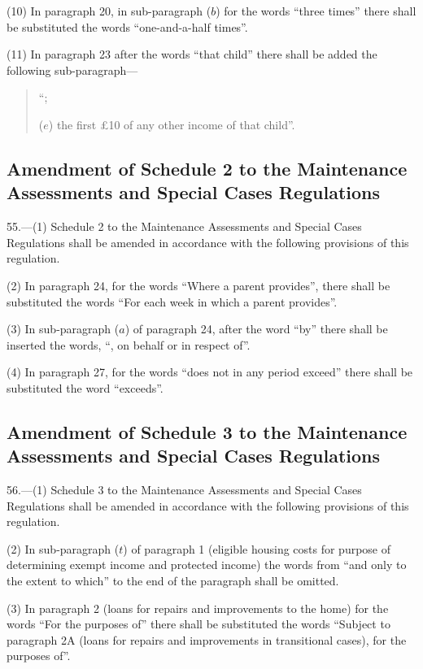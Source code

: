 \documentclass[a4paper]{article}
\begin{document}
(10) In paragraph 20, in sub-paragraph ($b$) for the words “three times” there shall be substituted the words “one-and-a-half times”.

(11) In paragraph 23 after the words “that child” there shall be added the following sub-paragraph—
\begin{quotation}
“;

($e$) the first £10 of any other income of that child”.
\end{quotation}

\subsection[55.Amendment of Schedule 2 to the Maintenance Assessments and Special Cases Regulations]{Amendment of Schedule 2 to the Maintenance Assessments and Special Cases Regulations}

55.—(1) Schedule 2 to the Maintenance Assessments and Special Cases Regulations shall be amended in accordance with the following provisions of this regulation.

(2) In paragraph 24, for the words “Where a parent provides”, there shall be substituted the words “For each week in which a parent provides”.

(3) In sub-paragraph ($a$) of paragraph 24, after the word “by” there shall be inserted the words, “, on behalf or in respect of”.

(4) In paragraph 27, for the words “does not in any period exceed” there shall be substituted the word “exceeds”.

\subsection[56. Amendment of Schedule 3 to the Maintenance Assessments and Special Cases Regulations]{Amendment of Schedule 3 to the Maintenance Assessments and Special Cases Regulations}

56.—(1) Schedule 3 to the Maintenance Assessments and Special Cases Regulations shall be amended in accordance with the following provisions of this regulation.

(2) In sub-paragraph ($t$) of paragraph 1 (eligible housing costs for purpose of determining exempt income and protected income) the words from “and only to the extent to which” to the end of the paragraph shall be omitted.

(3) In paragraph 2 (loans for repairs and improvements to the home) for the words “For the purposes of” there shall be substituted the words “Subject to paragraph 2A (loans for repairs and improvements in transitional cases), for the purposes of”.
\end{document}
